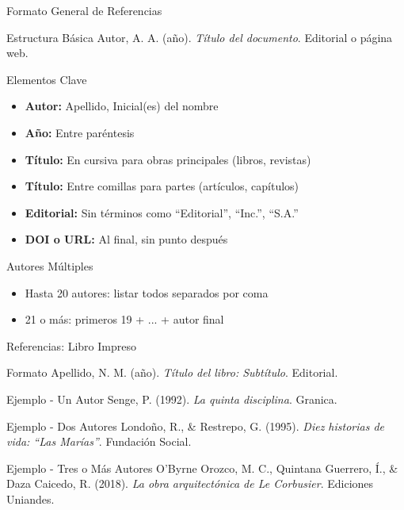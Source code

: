 \documentclass[spanish,aspectratio=169]{beamer}
\begin{document}
\begin{frame}{Formato General de Referencias}
	\begin{block}{Estructura Básica}
		\small
		Autor, A. A. (año). \textit{Título del documento}. Editorial o página web.
	\end{block}
	
	\begin{block}{Elementos Clave}
		\begin{itemize}
			\item \textbf{Autor:} Apellido, Inicial(es) del nombre
			\item \textbf{Año:} Entre paréntesis
			\item \textbf{Título:} En cursiva para obras principales (libros, revistas)
			\item \textbf{Título:} Entre comillas para partes (artículos, capítulos)
			\item \textbf{Editorial:} Sin términos como ``Editorial'', ``Inc.'', ``S.A.''
			\item \textbf{DOI o URL:} Al final, sin punto después
		\end{itemize}
	\end{block}
	
	\begin{exampleblock}{Autores Múltiples}
		\begin{itemize}
			\item Hasta 20 autores: listar todos separados por coma
			\item 21 o más: primeros 19 + ... + autor final
		\end{itemize}
	\end{exampleblock}
\end{frame}

\begin{frame}{Referencias: Libro Impreso}
	\begin{block}{Formato}
		\small
		Apellido, N. M. (año). \textit{Título del libro: Subtítulo}. Editorial.
	\end{block}
	
	\begin{exampleblock}{Ejemplo - Un Autor}
		\footnotesize
		Senge, P. (1992). \textit{La quinta disciplina}. Granica.
	\end{exampleblock}
	
	\begin{exampleblock}{Ejemplo - Dos Autores}
		\footnotesize
		Londoño, R., \& Restrepo, G. (1995). \textit{Diez historias de vida: ``Las Marías''}. Fundación Social.
	\end{exampleblock}
	
	\begin{exampleblock}{Ejemplo - Tres o Más Autores}
		\footnotesize
		O'Byrne Orozco, M. C., Quintana Guerrero, Í., \& Daza Caicedo, R. (2018). \textit{La obra arquitectónica de Le Corbusier}. Ediciones Uniandes.
	\end{exampleblock}
\end{frame}
\end{document}

